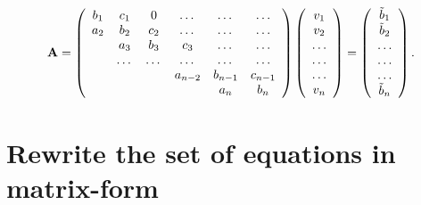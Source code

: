 \documentclass[10pt,a4paper]{article}
\begin{document}
\begin{equation}
    {\bf A} = \left(\begin{array}{cccccc}
                           b_1& c_1 & 0 &\dots   & \dots &\dots \\
                           a_2 & b_2 & c_2 &\dots &\dots &\dots \\
                           & a_3 & b_3 & c_3 & \dots & \dots \\
                           & \dots   & \dots &\dots   &\dots & \dots \\
                           &   &  &a_{n-2}  &b_{n-1}& c_{n-1} \\
                           &    &  &   &a_n & b_n \\
                      \end{array} \right)\left(\begin{array}{c}
                           v_1\\
                           v_2\\
                           \dots \\
                          \dots  \\
                          \dots \\
                           v_n\\
                      \end{array} \right)
  =\left(\begin{array}{c}
                           \tilde{b}_1\\
                           \tilde{b}_2\\
                           \dots \\
                           \dots \\
                          \dots \\
                           \tilde{b}_n\\
                      \end{array} \right).
\end{equation}

\section{Rewrite the set of equations in matrix-form}
\end{document}
